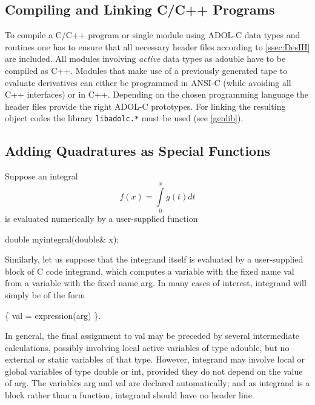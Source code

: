 \documentclass[11pt,twoside]{article}
\begin{document}
\subsection{Compiling and Linking C/C++ Programs}
%
To compile a C/C++ program or single module using ADOL-C
data types and routines one has to ensure that all necessary
header files according to \autoref{ssec:DesIH} are 
included. All modules involving {\em active} data types as
{\sf adouble}
have to be compiled as C++. Modules that make use of a previously
generated tape to evaluate derivatives can either be programmed in ANSI-C
(while avoiding all C++ interfaces) or in C++. Depending
on the chosen programming language the header files provide
the right ADOL-C prototypes. 
For linking the resulting object codes the library \verb=libadolc.*= 
must be used (see \autoref{genlib}). 
%
\subsection{Adding Quadratures as Special Functions}
%
\label{quadrat}
%
Suppose an integral 
\[ f(x) = \int\limits^{x}_{0} g(t) dt \]
is evaluated numerically by a user-supplied function 
\begin{center}
{\sf  double  myintegral(double\& x);}
\end{center}
Similarly, let us suppose that the integrand itself is evaluated by
a user-supplied block of C code {\sf integrand}, which computes a
variable with the fixed name {\sf val} from a variable with the fixed
name {\sf arg}. In many cases of interest, {\sf integrand} will
simply be of the form
\begin{center}
{\sf \{ val = expression(arg) \}}\enspace .
\end{center}
In general, the final assignment to {\sf val} may be preceded
by several intermediate calculations, possibly involving local 
active variables of type {\sf adouble}, but no external or static
variables of that type.  However, {\sf integrand} may involve local
or global variables of type {\sf double} or {\sf int}, provided they
do not depend on the value of {\sf arg}. The variables {\sf arg} and 
{\sf val} are declared automatically; and as {\sf integrand} is a block
rather than a function, {\sf integrand} should have no header line.  
\end{document}
